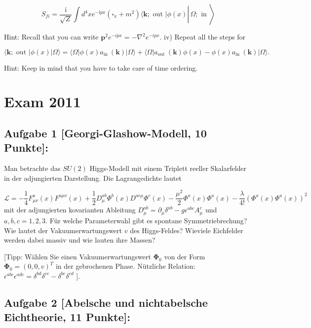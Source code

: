 \documentclass[10pt, letterpaper]{article}
\begin{document}
$$
\left.\left.S_{f i}=\frac{\mathrm{i}}{\sqrt{Z}} \int d^4 x e^{-\mathrm{i} p x}\left(\square_x+m^2\right)\langle\mathbf{k} ; \text { out }| \phi(x) \right\rvert\, \Omega ; \text { in }\right\rangle
$$


Hint: Recall that you can write $\mathbf{p}^2 e^{-i p x}=-\nabla^2 e^{-i p x}$.
iv) Repeat all the steps for

$$
\langle\mathbf{k} ; \text { out }| \phi(x)|\Omega\rangle=\langle\Omega| \phi(x) a_{\text {in }}(\mathbf{k})|\Omega\rangle+\langle\Omega| a_{\text {out }}(\mathbf{k}) \phi(x)-\phi(x) a_{\text {in }}(\mathbf{k})|\Omega\rangle .
$$


Hint: Keep in mind that you have to take care of time ordering.


\pagebreak



\section{Exam 2011}


\subsection{Aufgabe 1 [Georgi-Glashow-Modell, 10 Punkte]:}

Man betrachte das $S U(2)$ Higgs-Modell mit einem Triplett reeller Skalarfelder in der adjungierten Darstellung. Die Lagrangedichte lautet

$$
\mathcal{L}=-\frac{1}{4} F_{\mu \nu}^a(x) F^{a \mu \nu}(x)+\frac{1}{2} D_\mu^{a b} \Phi^b(x) D^{a c \mu} \Phi^c(x)-\frac{\mu^2}{2} \Phi^a(x) \Phi^a(x)-\frac{\lambda}{4!}\left(\Phi^a(x) \Phi^a(x)\right)^2
$$
mit der adjungierten kovarianten Ableitung $D_\mu^{a b}=\partial_\mu \delta^{a b}-g \epsilon^{a b c} A_\mu^c$ und $a, b, c=1,2,3$. Für welche Parameterwahl gibt es spontane Symmetriebrechung? Wie lautet der Vakuumerwartungswert $v$ des Higgs-Feldes? Wieviele Eichfelder werden dabei massiv und wie lauten ihre Massen?

[Tipp: Wählen Sie einen Vakuumerwartungswert $\mathbf{\Phi}_0$ von der Form $\mathbf{\Phi}_0=(0,0, v)^T$ in der gebrochenen Phase. Nützliche Relation: $\epsilon^{a b c} \epsilon^{a d e}=\delta^{b d} \delta^{c e}-\delta^{b e} \delta^{c d}$ ].

\subsection{Aufgabe 2 [Abelsche und nichtabelsche Eichtheorie, 11 Punkte]:}
\end{document}
